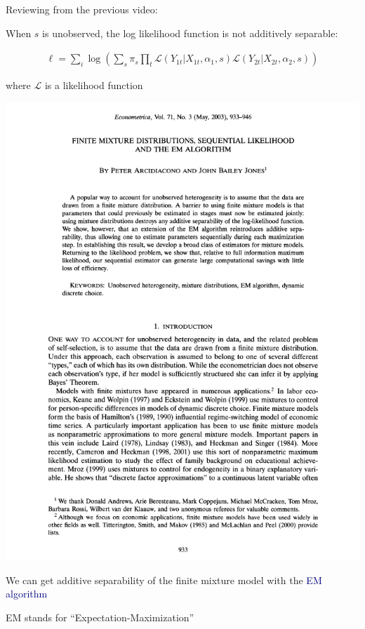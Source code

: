 \documentclass[aspectratio=169]{beamer}
\begin{document}
\begin{frame}

Reviewing from the previous video:

\bigskip

When $s$ is unobserved, the log likelihood function is not additively separable:

\begin{align*}
    \ell = \sum_i \log\left(\sum_s \pi_s \prod_t \mathcal{L}(Y_{1t}|X_{1t},\alpha_1,s) \mathcal{L}(Y_{2t}|X_{2t},\alpha_2,s)\right)
\end{align*}

\bigskip

where $\mathcal{L}$ is a likelihood function

\end{frame}

\begin{frame}
    \centering
    \includegraphics[width=.45\textwidth]{arcidi_jones_cover.jpg}
\end{frame}



\begin{frame}

We can get additive separability of the finite mixture model with the \textcolor{navy}{EM algorithm}

\bigskip

EM stands for ``Expectation-Maximization''

\bigskip


\bigskip


\end{frame}
\end{document}
